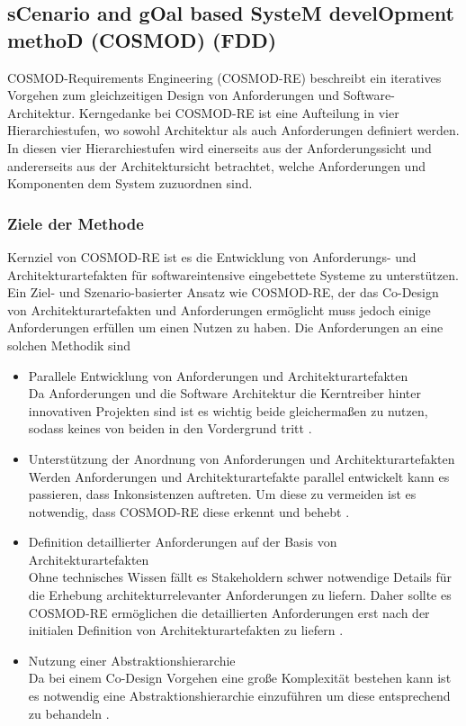 \subsection{sCenario and gOal based SysteM develOpment methoD (COSMOD) (FDD)}\label{scgo}
COSMOD-Requirements Engineering (COSMOD-RE) beschreibt ein iteratives Vorgehen zum gleichzeitigen Design von Anforderungen und Software-Architektur. Kerngedanke bei COSMOD-RE ist eine Aufteilung in vier Hierarchiestufen, wo sowohl Architektur als auch Anforderungen definiert werden. In diesen vier Hierarchiestufen wird einerseits aus der Anforderungssicht und andererseits aus der Architektursicht betrachtet, welche Anforderungen und Komponenten dem System zuzuordnen sind.
\subsubsection{Ziele der Methode}
Kernziel von COSMOD-RE ist es die Entwicklung von Anforderungs- und Architekturartefakten für softwareintensive eingebettete Systeme zu unterstützen. Ein Ziel- und Szenario-basierter Ansatz wie COSMOD-RE, der das Co-Design von Architekturartefakten und Anforderungen ermöglicht muss jedoch einige Anforderungen erfüllen um einen Nutzen zu haben. Die Anforderungen an eine solchen Methodik sind \cite{pohl}\\
 
\begin{itemize}
\item Parallele Entwicklung von Anforderungen und Architekturartefakten \\
Da Anforderungen und die Software Architektur die Kerntreiber hinter innovativen Projekten sind ist es wichtig beide gleichermaßen zu nutzen, sodass keines von beiden in den Vordergrund tritt \cite{pohl}.
\item Unterstützung der Anordnung von Anforderungen und Architekturartefakten \\
Werden Anforderungen und Architekturartefakte parallel entwickelt kann es passieren, dass Inkonsistenzen auftreten. Um diese zu vermeiden ist es notwendig, dass COSMOD-RE diese erkennt und behebt \cite{pohl}.
\item Definition detaillierter Anforderungen auf der Basis von Architekturartefakten \\
Ohne technisches Wissen fällt es Stakeholdern schwer notwendige Details für die Erhebung architekturrelevanter Anforderungen zu liefern. Daher sollte es COSMOD-RE ermöglichen die detaillierten Anforderungen erst nach der initialen Definition von Architekturartefakten zu liefern \cite{pohl}. 
\item Nutzung einer Abstraktionshierarchie \\
Da bei einem Co-Design Vorgehen eine große Komplexität bestehen kann ist es notwendig eine Abstraktionshierarchie einzuführen um diese entsprechend zu behandeln \cite{pohl}.\\
\end{itemize}


